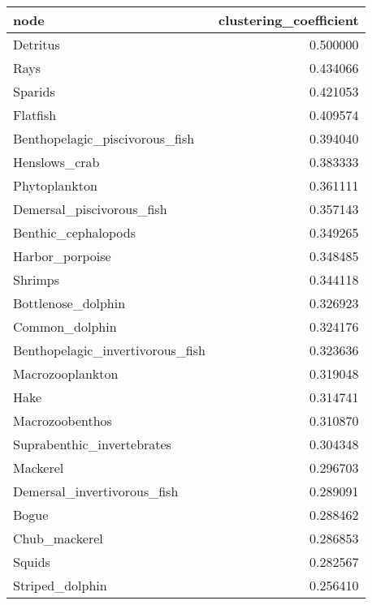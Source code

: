 \begin{tabular}{lr}
\toprule
                            node &  clustering\_coefficient \\
\midrule
                        Detritus &                0.500000 \\
                            Rays &                0.434066 \\
                         Sparids &                0.421053 \\
                        Flatfish &                0.409574 \\
  Benthopelagic\_piscivorous\_fish &                0.394040 \\
                   Henslows\_crab &                0.383333 \\
                   Phytoplankton &                0.361111 \\
       Demersal\_piscivorous\_fish &                0.357143 \\
             Benthic\_cephalopods &                0.349265 \\
                 Harbor\_porpoise &                0.348485 \\
                         Shrimps &                0.344118 \\
              Bottlenose\_dolphin &                0.326923 \\
                  Common\_dolphin &                0.324176 \\
Benthopelagic\_invertivorous\_fish &                0.323636 \\
                Macrozooplankton &                0.319048 \\
                            Hake &                0.314741 \\
                 Macrozoobenthos &                0.310870 \\
      Suprabenthic\_invertebrates &                0.304348 \\
                        Mackerel &                0.296703 \\
     Demersal\_invertivorous\_fish &                0.289091 \\
                           Bogue &                0.288462 \\
                   Chub\_mackerel &                0.286853 \\
                          Squids &                0.282567 \\
                 Striped\_dolphin &                0.256410 \\

\end{tabular}
